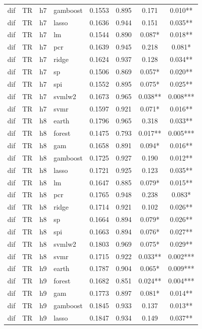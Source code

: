 \begin{ThreePartTable}
\begin{longtable}[t]{llclcccc}
dif & TR & h7 & gamboost & 0.1553 & 0.895 & 0.171 & 0.010**\\
dif & TR & h7 & lasso & 0.1636 & 0.944 & 0.151 & 0.035**\\
dif & TR & h7 & lm & 0.1544 & 0.890 & 0.087* & 0.018**\\
dif & TR & h7 & pcr & 0.1639 & 0.945 & 0.218 & 0.081*\\
dif & TR & h7 & ridge & 0.1624 & 0.937 & 0.128 & 0.034**\\
dif & TR & h7 & sp & 0.1506 & 0.869 & 0.057* & 0.020**\\
dif & TR & h7 & spi & 0.1552 & 0.895 & 0.075* & 0.025**\\
dif & TR & h7 & svmlw2 & 0.1673 & 0.965 & 0.038** & 0.008***\\
dif & TR & h7 & svmr & 0.1597 & 0.921 & 0.071* & 0.016**\\
\addlinespace
dif & TR & h8 & earth & 0.1796 & 0.965 & 0.318 & 0.033**\\
dif & TR & h8 & forest & 0.1475 & 0.793 & 0.017** & 0.005***\\
dif & TR & h8 & gam & 0.1658 & 0.891 & 0.094* & 0.016**\\
dif & TR & h8 & gamboost & 0.1725 & 0.927 & 0.190 & 0.012**\\
dif & TR & h8 & lasso & 0.1721 & 0.925 & 0.123 & 0.035**\\
dif & TR & h8 & lm & 0.1647 & 0.885 & 0.079* & 0.015**\\
dif & TR & h8 & pcr & 0.1765 & 0.948 & 0.238 & 0.083*\\
dif & TR & h8 & ridge & 0.1714 & 0.921 & 0.102 & 0.026**\\
dif & TR & h8 & sp & 0.1664 & 0.894 & 0.079* & 0.026**\\
dif & TR & h8 & spi & 0.1663 & 0.894 & 0.076* & 0.027**\\
dif & TR & h8 & svmlw2 & 0.1803 & 0.969 & 0.075* & 0.029**\\
dif & TR & h8 & svmr & 0.1715 & 0.922 & 0.033** & 0.002***\\
\addlinespace
dif & TR & h9 & earth & 0.1787 & 0.904 & 0.065* & 0.009***\\
dif & TR & h9 & forest & 0.1682 & 0.851 & 0.024** & 0.004***\\
dif & TR & h9 & gam & 0.1773 & 0.897 & 0.081* & 0.014**\\
dif & TR & h9 & gamboost & 0.1845 & 0.933 & 0.137 & 0.013**\\
dif & TR & h9 & lasso & 0.1847 & 0.934 & 0.149 & 0.037**\\

\end{longtable}
\end{ThreePartTable}

